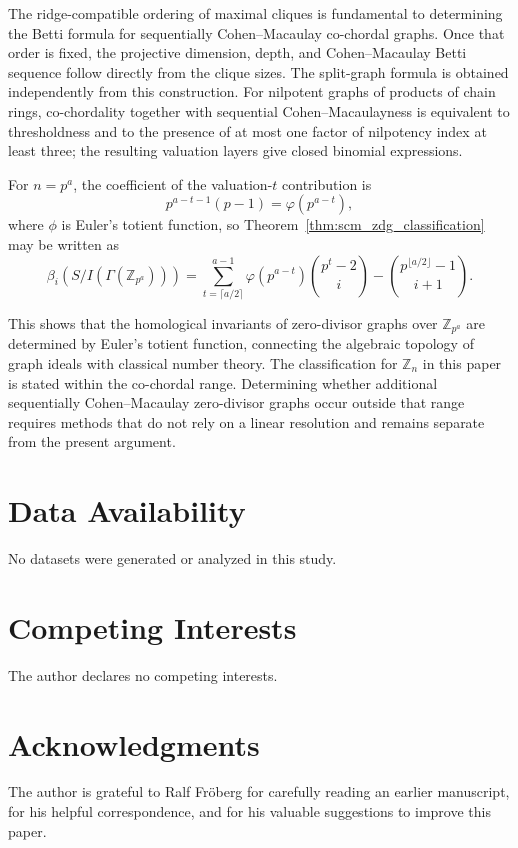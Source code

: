 \documentclass[12pt, reqno]{amsart}
\theoremstyle{definition}
\numberwithin{equation}{section}
\begin{document}
The ridge-compatible ordering of maximal cliques is fundamental to determining the Betti formula for sequentially Cohen--Macaulay co-chordal graphs. Once that order is fixed, the projective dimension, depth, and Cohen--Macaulay Betti sequence follow directly from the clique sizes.  The split-graph formula is obtained independently from this construction.  For nilpotent graphs of products of chain rings, co-chordality together with sequential Cohen--Macaulayness is equivalent to thresholdness and to the presence of at most one factor of nilpotency index at least three; the resulting valuation layers give closed binomial expressions.

For $n=p^a$, the coefficient of the valuation-$t$ contribution is
\[
p^{a-t-1}(p-1)=\varphi(p^{a-t}),
\]
where $\phi$ is Euler's totient function, so Theorem~\ref{thm:scm_zdg_classification} may be written as
\[
\beta_i(S/I(\Gamma(\mathbb Z_{p^a})))
=
\sum_{t=\lceil a/2\rceil}^{a-1}
\varphi(p^{a-t})\binom{p^t-2}{i}
-
\binom{p^{\lfloor a/2\rfloor}-1}{i+1}.
\]

This shows that the homological invariants of zero-divisor graphs over $\mathbb{Z}_{p^a}$ are determined by Euler's totient function, connecting the algebraic topology of graph ideals with classical number theory.
The classification for $\mathbb Z_n$ in this paper is stated within the co-chordal range.  Determining whether additional sequentially Cohen--Macaulay zero-divisor graphs occur outside that range requires methods that do not rely on a linear resolution and remains separate from the present argument.

\section*{Data Availability}
No datasets were generated or analyzed in this study.
	
	\section*{Competing Interests}
The author declares no competing interests.
	
	\section*{Acknowledgments}
	The author is grateful to Ralf Fr\"oberg for carefully reading an earlier manuscript, for his helpful correspondence, and for his valuable suggestions to improve this paper.
	
{\raggedright
	

}
	
\end{document}
